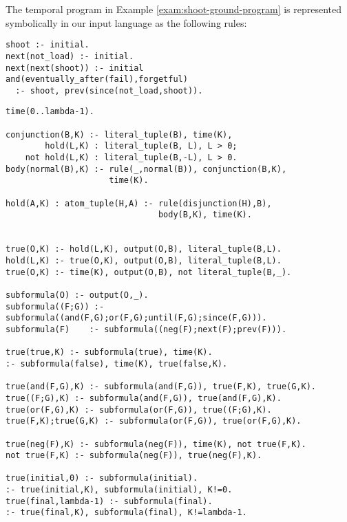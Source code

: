 \begin{example}\label{exam:shoot-ground-symbolic}
  The temporal program in Example \ref{exam:shoot-ground-program} is
  represented symbolically in our input language as the following rules:
\begin{center}
    \begin{lstlisting}[numbers=none]
shoot :- initial.
next(not_load) :- initial.
next(next(shoot)) :- initial
and(eventually_after(fail),forgetful) 
  :- shoot, prev(since(not_load,shoot)).
    \end{lstlisting}
\end{center}
\end{example}

\begin{center}
\begin{minipage}{\linewidth}
\begin{lstlisting}[language=clingo, label={lst:meta-telingo-one}]
time(0..lambda-1).

conjunction(B,K) :- literal_tuple(B), time(K),
        hold(L,K) : literal_tuple(B, L), L > 0;
    not hold(L,K) : literal_tuple(B,-L), L > 0.
body(normal(B),K) :- rule(_,normal(B)), conjunction(B,K), 
                     time(K).

hold(A,K) : atom_tuple(H,A) :- rule(disjunction(H),B), 
                               body(B,K), time(K).


true(O,K) :- hold(L,K), output(O,B), literal_tuple(B,L).
hold(L,K) :- true(O,K), output(O,B), literal_tuple(B,L).
true(O,K) :- time(K), output(O,B), not literal_tuple(B,_).

subformula(O) :- output(O,_).
subformula((F;G)) :- subformula((and(F,G);or(F,G);until(F,G);since(F,G))).
subformula(F)	 :- subformula((neg(F);next(F);prev(F))).

true(true,K) :- subformula(true), time(K).
:- subformula(false), time(K), true(false,K).

true(and(F,G),K) :- subformula(and(F,G)), true(F,K), true(G,K).
true((F;G),K) :- subformula(and(F,G)), true(and(F,G),K).
true(or(F,G),K) :- subformula(or(F,G)), true((F;G),K).
true(F,K);true(G,K) :- subformula(or(F,G)), true(or(F,G),K).

true(neg(F),K) :- subformula(neg(F)), time(K), not true(F,K).
not true(F,K) :- subformula(neg(F)), true(neg(F),K).

true(initial,0) :- subformula(initial).
:- true(initial,K), subformula(initial), K!=0.
true(final,lambda-1) :- subformula(final).
:- true(final,K), subformula(final), K!=lambda-1.


\end{lstlisting}
\end{minipage}
\end{center}
